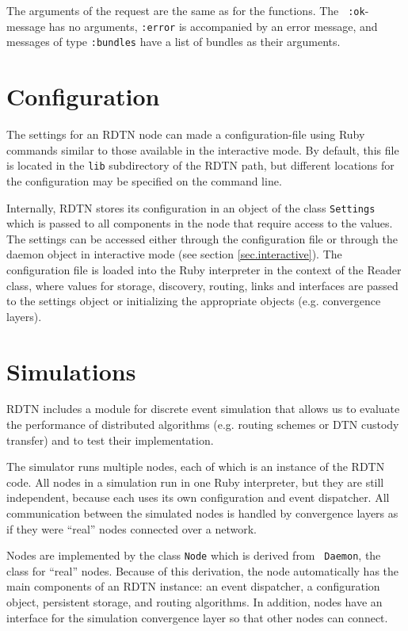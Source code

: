 \documentclass[a4paper]{article}
\begin{document}
The arguments of the request are the same as for the functions. The {\tt
:ok}-message has no arguments, {\tt :error} is accompanied by an error message,
and messages of type {\tt :bundles} have a list of bundles as their arguments.

\section{Configuration}\label{sec.config}

The settings for an RDTN node can made a configuration-file using Ruby commands
similar to those available in the interactive mode. By default, this file is
located in the {\tt lib} subdirectory of the RDTN path, but different locations
for the configuration may be specified on the command line.

Internally, RDTN stores its configuration in an object of the class
{\tt Settings} which is passed to all components in the node that require
access to the values. The settings can be accessed either through the
configuration file or through the daemon object in interactive mode (see section
\ref{sec.interactive}). The configuration file is loaded into the Ruby
interpreter in the context of the Reader class, where values for
storage, discovery, routing, links and interfaces are passed to the settings
object or initializing the appropriate objects (e.g. convergence layers).

\section{Simulations}\label{sec.sim}

RDTN includes a module for discrete event simulation that allows us to evaluate
the performance of distributed algorithms (e.g.  routing schemes or DTN custody
transfer) and to test their implementation.

The simulator runs multiple nodes, each of which is an instance of the RDTN
code. All nodes in a simulation run in one Ruby interpreter, but they are still
independent, because each uses its own configuration and event dispatcher. All
communication between the simulated nodes is handled by convergence layers
as if they were ``real'' nodes connected over a network.

Nodes are implemented by the class {\tt Node} which is derived from {\tt
Daemon}, the class for ``real'' nodes. Because of this derivation, the node
automatically has the main components of an RDTN instance: an event dispatcher,
a configuration object, persistent storage, and routing algorithms. In addition,
nodes have an interface for the simulation convergence layer so that other nodes
can connect.
\end{document}
